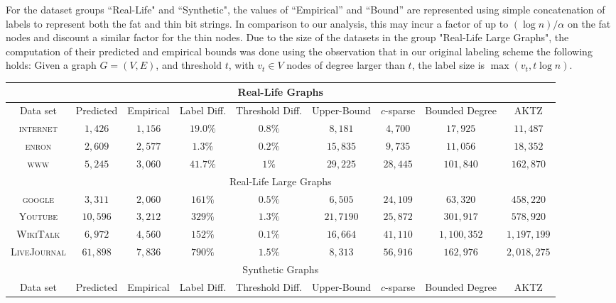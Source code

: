 For the dataset groups ``Real-Life" and ``Synthetic", the values of  ``Empirical'' and  ``Bound'' are represented using simple concatenation of labels to represent both the fat and thin bit strings. 
In comparison to our analysis, this may incur a factor of up to $(\log n)/\alpha$  on the fat nodes and discount a similar factor for the thin nodes.
Due to the size of the datasets in the group  "Real-Life Large Graphs", the computation of their predicted and empirical bounds was done using the observation that in our original labeling scheme the following holds: Given a  graph $G=(V,E)$, and threshold $t$, with $v_t \in V$ nodes of degree larger than $t$, the label size is $\max{(v_t,t \log n)}$. 

\begin{table}
\small
\begin{tabular}{ccccccccc}
\hline \multicolumn{9}{c}{Real-Life Graphs}\\\hline
Data set&Predicted &Empirical & Label Diff. & Threshold Diff.   & Upper-Bound     &$c$-sparse &Bounded Degree \cite{adjiashvili2014labeling} &AKTZ \cite{alstrup2014adjacency}\\\hline
\textsc{internet}   &$1,426$    &$1,156$  & $19.0\%$  & $0.8\%$  & $8,181 $  &$4,700$      &$17,925$  &$11,487$\\
\textsc{enron}      &$2,609$    &$2,577$  & $1.3\%$ & $0.2\%$   & $15,835 $ &$9,735$      &$11,056$  &$18,352$\\
\textsc{www}        &$5,245$    &$3,060$  & $41.7\%$  & $1\%$  & $29,225 $ &$28,445$     &$101,840$ &$162,870$ \\
\hline \multicolumn{9}{c}{Real-Life Large Graphs}\\\hline
\textsc{google} & $3,311$ & $2,060$ & $161\%$ & $0.5\%$ & $6,505$ & $24,109$ & $63,320$ & $458,220$\\
\textsc{Youtube}        &$10,596$    &$3,212$  & $329\%$  & $1.3\%$  & $21,7190$ &$25,872$     &$301,917$ &$578,920$ \\
\textsc{WikiTalk}       & $6,972$ & $4,560$ & $152\%$ & $0.1\%$ & $16,664$ & $41,110$ & $1,100,352$ & $1,197,199$\\ 
\textsc{LiveJournal}        &$61,898$    &$7,836$  & $790\%$  & $1.5\%$  & $8,313$ &$56,916$     &$162,976$ &$2,018,275$ \\\hline
\multicolumn{9}{c}{Synthetic Graphs}\\\hline
Data set&Predicted &Empirical & Label Diff. & Threshold Diff.   & Upper-Bound     &$c$-sparse &Bounded Degree \cite{adjiashvili2014labeling} &AKTZ \cite{alstrup2014adjacency}\\\hline

\end{tabular}
\end{table}
